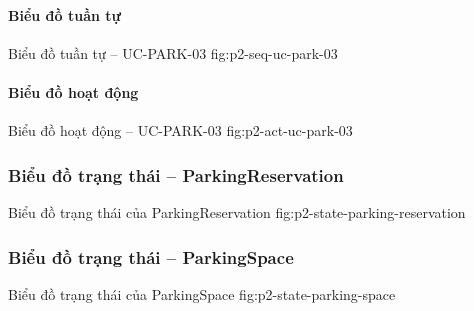 \clearpage
\paragraph{Biểu đồ tuần tự}
  {Biểu đồ tuần tự -- UC-PARK-03}
  {fig:p2-seq-uc-park-03}

\clearpage
\paragraph{Biểu đồ hoạt động}
  {Biểu đồ hoạt động -- UC-PARK-03}
  {fig:p2-act-uc-park-03}

\clearpage

\subsubsection{Biểu đồ trạng thái -- ParkingReservation}

  {Biểu đồ trạng thái của ParkingReservation}
  {fig:p2-state-parking-reservation}

\clearpage

\subsubsection{Biểu đồ trạng thái -- ParkingSpace}

  {Biểu đồ trạng thái của ParkingSpace}
  {fig:p2-state-parking-space}

\clearpage
